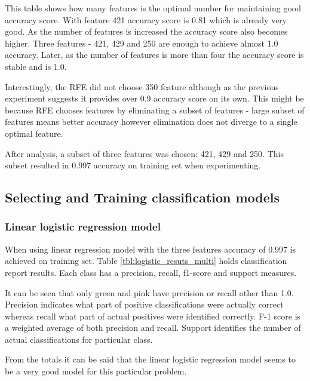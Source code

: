 \documentclass[11pt]{article}
\begin{document}
		This table shows how many features is the optimal number for maintaining good accuracy score. With feature 421 accuracy score is 0.81 which is already very good. As the number of features is increased the accuracy score also becomes higher. Three features - 421, 429 and 250 are enough to achieve almost 1.0 accuracy. Later, as the number of features is more than four the accuracy score is stable and is 1.0.

		Interestingly, the RFE did not choose 350 feature although as the previous experiment suggests it provides over 0.9 accuracy score on its own. This might be because RFE chooses features by eliminating a subset of features - large subset of features means better accuracy however elimination does not diverge to a single optimal feature. 

		After analysis, a subset of three features was chosen: 421, 429 and 250. This subset resulted in 0.997 accuracy on training set when experimenting.

		\subsection{Selecting and Training classification models}
			\subsubsection{Linear logistic regression model}
 			 	When using linear regression model with the three features accuracy of 0.997 is achieved on training set. Table \ref{tbl:logistic_resuts_multi} holds classification report results. Each class has a precision, recall, f1-score and support measures. 

 			 	It can be seen that only green and pink have precision or recall other than 1.0. Precision indicates what part of positive classifications were actually correct whereas recall what part of actual positives were identified correctly. F-1 score is a weighted average of both precision and recall. Support identifies the number of actual classifications for particular class.

 			 	From the totals it can be said that the linear logistic regression model seems to be a very good model for this particular problem. 
\end{document}
